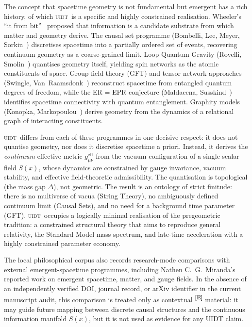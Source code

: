 \documentclass[12pt,a4paper,twoside]{article}
\theoremstyle{plain}
\theoremstyle{definition}
\theoremstyle{remark}
\newcommand{\UIDT}{\textsc{uidt}}
\newcommand{\catmark}[1]{\textsuperscript{\textsf{\textbf{[#1]}}}}
\newcommand{\Sx}{S(x)}
\begin{document}
The concept that spacetime geometry is not fundamental but emergent has a rich
history, of which \UIDT\ is a specific and highly constrained realisation.
Wheeler's ``it from bit''~\cite{Wheeler1990} proposed that information is a
candidate substrate from which matter and geometry derive. The causal set
programme (Bombelli, Lee, Meyer, Sorkin~\cite{Sorkin2005}) discretises
spacetime into a partially ordered set of events, recovering continuum geometry
as a coarse-grained limit. Loop Quantum Gravity (Rovelli, Smolin~\cite{Rovelli2004})
quantises geometry itself, yielding spin networks as the atomic constituents of
space. Group field theory (GFT) and tensor-network approaches (Swingle,
Van~Raamsdonk~\cite{Swingle2012}) reconstruct spacetime from entangled quantum
degrees of freedom, while the ER = EPR conjecture (Maldacena, Susskind~\cite{Maldacena2013})
identifies spacetime connectivity with quantum entanglement. Graphity models
(Konopka, Markopoulou~\cite{Konopka2008}) derive geometry from the dynamics of
a relational graph of interacting constituents.

\UIDT\ differs from each of these programmes in one decisive respect: it does
not quantise geometry, nor does it discretise spacetime a priori. Instead, it
derives the \emph{continuum} effective metric $g_{\mu\nu}^{\mathrm{eff}}$ from
the vacuum configuration of a single scalar field $\Sx$, whose dynamics are
constrained by gauge invariance, vacuum stability, and effective field-theoretic admissibility.
The quantisation is topological (the mass gap $\Delta$), not geometric. The
result is an ontology of strict finitude: there is no multiverse of vacua
(String Theory), no ambiguously defined continuum limit (Causal Sets), and no
need for a background time parameter (GFT). \UIDT\ occupies a logically minimal
realisation of the pregeometric tradition: a constrained structural theory that
aims to reproduce general relativity, the Standard Model mass spectrum, and late-time
acceleration with a highly constrained parameter economy.

The local philosophical corpus also records research-mode comparisons with
external emergent-spacetime programmes, including Nathen C.~G.~Miranda's
reported work on emergent spacetime, matter, and gauge fields. In the absence
of an independently verified DOI, journal record, or arXiv identifier in the
current manuscript audit, this comparison is treated only as contextual
\catmark{E} material: it may guide future mapping between discrete causal
structures and the continuous information manifold $\Sx$, but it is not used
as evidence for any UIDT claim.
\end{document}
